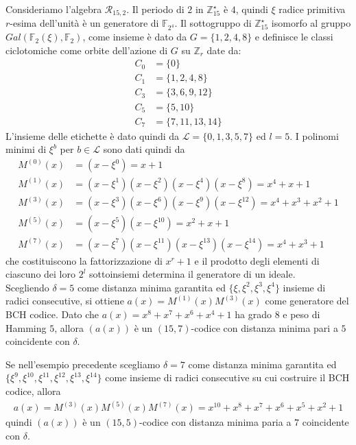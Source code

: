 \begin{esempio}
   Consideriamo l'algebra $\mathcal{R}_{15,2}$. Il periodo di $2$ in $\mathbb{Z}_{15}^{\star}$ è $4$, quindi $\xi$ radice primitiva $r$-esima dell'unità è un generatore di $\mathbb{F}_{2^4}$. Il sottogruppo di $\mathbb{Z}_{15}^{\star}$ isomorfo al gruppo $Gal(\mathbb{F}_{2}(\xi), \mathbb{F}_{2})$, come insieme è dato da $G = \lbrace 1,2,4,8 \rbrace$ e definisce le classi ciclotomiche come orbite dell'azione di $G$ su $\mathbb{Z}_{r}$ date da:
   \begin{align*}
      C_{0} &= \lbrace 0 \rbrace \\
      C_{1} &= \lbrace 1,2,4,8 \rbrace \\
      C_{3} &= \lbrace 3,6,9,12 \rbrace \\
      C_{5} &= \lbrace 5, 10 \rbrace \\
      C_{7} &= \lbrace 7,11,13,14 \rbrace
   \end{align*}
   L'insieme delle etichette è dato quindi da $\mathscr{L} = \lbrace 0,1,3,5,7 \rbrace $ ed $l = 5$. I polinomi minimi di $\xi^{b}$ per $b\in \mathscr{L}$ sono dati quindi da
   \begin{align*}
      M^{(0)}(x) &= (x - \xi^{0}) = x + 1\\
      M^{(1)}(x) &=  (x - \xi^{1})(x - \xi^{2})(x - \xi^{4})(x - \xi^{8}) = x^4 + x + 1\\
      M^{(3)}(x) &=  (x - \xi^{3})(x - \xi^{6})(x - \xi^{9})(x - \xi^{12}) = x^4 + x^3 + x^2 + 1 \\
      M^{(5)}(x) &=  (x - \xi^{5})(x - \xi^{10}) = x^2 + x + 1\\
      M^{(7)}(x) &=  (x - \xi^{7})(x - \xi^{11})(x - \xi^{13})(x - \xi^{14}) = x^4 + x^3 + 1
   \end{align*}
   che costituiscono la fattorizzazione di $x^r + 1$ e il prodotto degli elementi di ciascuno dei loro $2^{l}$ sottoinsiemi determina il generatore di un ideale. \\
   Scegliendo $\delta = 5$ come distanza minima garantita ed $\lbrace \xi, \xi^2, \xi^3, \xi^4 \rbrace$ insieme di radici consecutive, si ottiene $a(x) = M^{(1)}(x) M^{(3)}(x) $ come generatore del BCH codice. Dato che $a(x) = x^8 + x^7 + x^6 + x^4 + 1$ ha grado $8$ e peso di Hamming $5$, allora $(a(x))$ è un $(15,7)$-codice con distanza minima pari a $5$ coincidente con $\delta$.
\end{esempio}

\begin{esempio}
   Se nell'esempio precedente scegliamo $\delta = 7$ come distanza minima garantita ed $\lbrace \xi^{9}, \xi^{10}, \xi^{11}, \xi^{12}, \xi^{13}, \xi^{14} \rbrace$ come insieme di radici consecutive su cui costruire il BCH codice, allora
   \begin{align*}
      a(x) = M^{(3)}(x) M^{(5)}(x) M^{(7)}(x) = x^{10}+ x^8 + x^7 + x^6 + x^5 + x^2 + 1
   \end{align*}
   quindi $(a(x))$ è un $(15,5)$-codice con distanza minima paria a $7$ coincidente con $\delta$.
\end{esempio}


